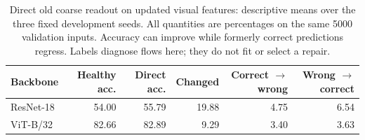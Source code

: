 \begin{table}[t]
\centering
\caption{Direct old coarse readout on updated visual features: descriptive means over the three fixed development seeds. All quantities are percentages on the same 5000 validation inputs. Accuracy can improve while formerly correct predictions regress. Labels diagnose flows here; they do not fit or select a repair.}
\label{tab:suffix_direct_flows}
\begin{tabular}{lrrrrr}
\toprule
Backbone & Healthy acc. & Direct acc. & Changed & Correct $\to$ wrong & Wrong $\to$ correct \\
\midrule
ResNet-18 & 54.00 & 55.79 & 19.88 & 4.75 & 6.54 \\
ViT-B/32 & 82.66 & 82.89 & 9.29 & 3.40 & 3.63 \\
\bottomrule
\end{tabular}
\end{table}
